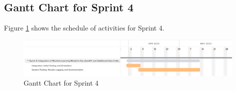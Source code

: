 \subsection{Gantt Chart for Sprint 4}
\label{subsec:gantt_chart_sprint4}
Figure \ref{fig:gantt_chart_sprint4} shows the schedule of activities for Sprint 4.
\begin{figure}[ht]
    \centering
    \includegraphics[width=1\textwidth]{./assets/Chapter_3/Gantt/Gantt_Chart_Sprint4.png}
    \caption{Gantt Chart for Sprint 4}
    \label{fig:gantt_chart_sprint4}
\end{figure}
\FloatBarrier